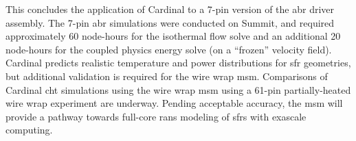 \documentclass[3p,,preprint,11pt]{elsarticle}
\begin{document}
This concludes the application of Cardinal to a 7-pin version of the \gls{abr} driver assembly. The 7-pin \gls{abr} simulations were conducted on Summit, and required approximately 60 node-hours for the isothermal flow solve and an additional 20 node-hours for the coupled physics energy solve (on a ``frozen'' velocity field). Cardinal predicts realistic temperature and power distributions for \gls{sfr} geometries, but additional validation is required for the wire wrap \gls{msm}. Comparisons of Cardinal \gls{cht} simulations using the wire wrap \gls{msm} using a 61-pin partially-heated wire wrap experiment \cite{mays} are underway. Pending acceptable accuracy, the \gls{msm} will provide a pathway towards full-core \gls{rans} modeling of \glspl{sfr} with exascale computing.

\begin{comment}
\section{Cardinal's Postprocessing Systems}
\label{sec:postprocessing}

Data postprocessing is an important component of modeling and simulation. For example, a common postprocessing operation involves reducing 3-D vector fields to scalars for purposes such as evaluating energy conservation, assessing time convergence of pseudo-steady calculations, and generating closure terms for low-order methods, such as friction factors for a subchannel solver.

As a standalone tool, OpenMC provides a rich Python API for data manipulation using Python modules such as {\tt matplotlib}. Conversely, NekRS as a standalone tool has limited native capabilities for data postprocessing. Users typically write case-specific {\tt C++} source code to evaluate quantities like pressure drop and heat flux. To expand the toolbox of the computational analyst, Cardinal supplements the postprocessing capabilities of OpenMC and NekRS as standalone tools in two distinct manners.

By projecting the NekRS spectral element solution and OpenMC tally results onto \gls{moose} mesh mirrors, the NekRS and OpenMC solutions are exposed to \gls{moose}'s {\tt Postprocessor} and {\tt UserObject} systems. These systems have extensive capabilities for evaluating extrema/integrals/averages of spatial fields,  computing $L_2$ norms relative to other fields, and much more. However, this approach is limited to the mesh mirror representation of the OpenMC and NekRS solutions. That is, because the mesh mirror is a low-order projection of the high-order NekRS spectral element solution, the ``native'' \gls{moose}-based postprocessing systems will not capture the full fidelity of the NekRS solution. 
Likewise, if the mirror mesh elements do not perfectly align with the OpenMC cell boundaries, there may be some distortion in the spatial mapping from cells to elements. 


\end{comment}
\end{document}
